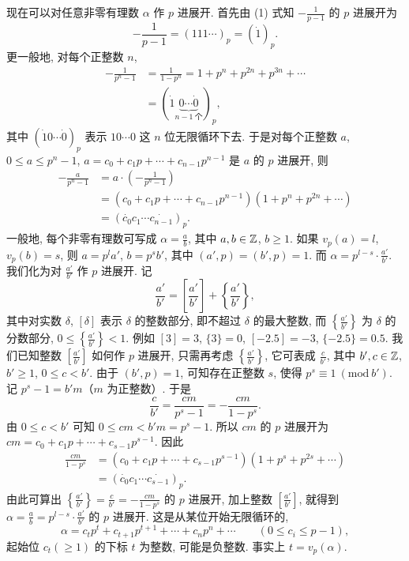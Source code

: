 现在可以对任意非零有理数 $\alpha$ 作 $p$ 进展开. 首先由 (1) 式知 $-\frac{1}{p-1}$ 的 $p$ 进展开为
\[
  -\frac{1}{p-1}=(111\cdots)_p=(\dot{1})_p.
\]
更一般地, 对每个正整数 $n$,
\begin{align*}
  -\frac{1}{p^n-1}&=\frac{1}{1-p^n}=1+p^n+p^{2n}+p^{3n}+\cdots\\
  &=(\dot{1}\underbrace{0\cdots\dot{0}}_{n-1\ \text{个}})_p,
\end{align*}
其中 $(\dot{1}0\cdots\dot{0})_p$ 表示 $10\cdots 0$ 这 $n$ 位无限循环下去. 于是对每个正整数 $a$, $0\leqslant a\leqslant p^n-1$, $a=c_0+c_1p+\cdots+c_{n-1}p^{n-1}$ 是 $a$ 的 $p$ 进展开, 则
\begin{align*}
  -\frac{a}{p^n-1}&=a\cdot\left(-\frac{1}{p^n-1}\right)\\
  &=(c_0+c_1p+\cdots+c_{n-1}p^{n-1})(1+p^n+p^{2n}+\cdots)\\
  &=(\dot{c_0}c_1\cdots\dot{c_{n-1}})_p.
\end{align*}
一般地, 每个非零有理数可写成 $\alpha=\frac{a}{b}$, 其中 $a,b\in\mathbb{Z}$, $b\geqslant 1$. 如果 $v_p(a)=l$, $v_p(b)=s$, 则 $a=p^la'$, $b=p^sb'$, 其中 $(a',p)=(b',p)=1$. 而 $\alpha=p^{l-s}\cdot\frac{a'}{b'}$. 我们化为对 $\frac{a'}{b'}$ 作 $p$ 进展开. 记
\[
  \frac{a'}{b'}=\left[\frac{a'}{b'}\right]+\left\{\frac{a'}{b'}\right\},
\]
其中对实数 $\delta$, $[\delta]$ 表示 $\delta$ 的整数部分, 即不超过 $\delta$ 的最大整数, 而 $\left\{\frac{a'}{b'}\right\}$ 为 $\delta$ 的分数部分, $0\leqslant\left\{\frac{a'}{b'}\right\}<1$. 例如 $[3]=3$, $\{3\}=0$, $[-2.5]=-3$, $\{-2.5\}=0.5$. 我们已知整数 $\left[\frac{a'}{b'}\right]$ 如何作 $p$ 进展开, 只需再考虑 $\left\{\frac{a'}{b'}\right\}$, 它可表成 $\frac{c}{b'}$, 其中 $b',c\in\mathbb{Z}$, $b'\geqslant 1$, $0\leqslant c<b'$. 由于 $(b',p)=1$, 可知存在正整数 $s$, 使得 $p^s\equiv 1\ (\mathrm{mod}\ b')$. 记 $p^s-1=b'm$（$m$ 为正整数）. 于是
\[
  \frac{c}{b'}=\frac{cm}{p^s-1}=-\frac{cm}{1-p^s}.
\]
由 $0\leqslant c<b'$ 可知 $0\leqslant cm< b'm=p^s-1$. 所以 $cm$ 的 $p$ 进展开为 $cm=c_0+c_1p+\cdots+c_{s-1}p^{s-1}$. 因此
\begin{align*}
  \frac{cm}{1-p^s}&=(c_0+c_1p+\cdots+c_{s-1}p^{s-1})(1+p^s+p^{2s}+\cdots)\\
  &=(\dot{c_0}c_1\cdots\dot{c_{s-1}})_p.
\end{align*}
由此可算出 $\left\{\frac{a'}{b'}\right\}=\frac{c}{b'}=-\frac{cm}{1-p^s}$ 的 $p$ 进展开, 加上整数 $\left[\frac{a'}{b'}\right]$, 就得到 $\alpha=\frac{a}{b}=p^{l-s}\cdot\frac{a'}{b'}$ 的 $p$ 进展开. 这是从某位开始无限循环的,
\[
  \alpha=c_tp^t+c_{t+1}p^{t+1}+\cdots+c_np^n+\cdots\qquad(0\leqslant c_i\leqslant p-1),
\]
起始位 $c_t(\geqslant 1)$ 的下标 $t$ 为整数, 可能是负整数. 事实上 $t=v_p(\alpha)$.


